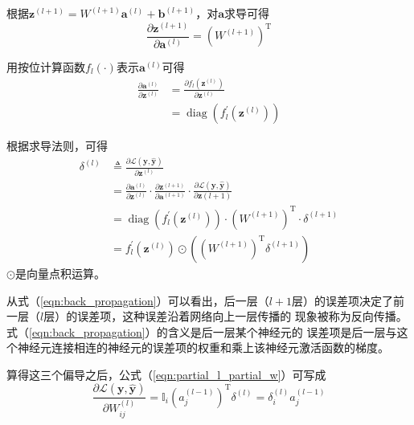 根据$\mathbf{z}^{(l+1)}=W^{(l+1)} \mathbf{a}^{(l)}+\mathbf{b}^{(l+1)}$，对$\mathbf{a}$求导可得
\begin{equation} 
\frac{\partial \mathbf{z}^{(l+1)}}{\partial \mathbf{a}^{(l)}}=\left(W^{(l+1)}\right)^{\mathrm{T}}
 \end{equation}

用按位计算函数$f_{l}(\cdot)$表示$\mathbf{a}^{(l)}$可得
\begin{equation} 
\begin{aligned} \frac{\partial \mathbf{a}^{(l)}}{\partial \mathbf{z}^{(l)}} &=\frac{\partial f_{l}\left(\mathbf{z}^{(l)}\right)}{\partial \mathbf{z}^{(l)}} \\ &=\operatorname{diag}\left(f_{l}^{\prime}\left(\mathbf{z}^{(l)}\right)\right) \end{aligned}
 \end{equation}

根据求导法则，可得
\begin{equation} 
\label{eqn:back_propagation}
\begin{aligned} \delta^{(l)} & \triangleq \frac{\partial \mathcal{L}(\mathbf{y}, \hat{\mathbf{y}})}{\partial \mathbf{z}^{(l)}} \\ 
&=\frac{\partial \mathbf{a}^{(l)}}{\partial \mathbf{z}^{(l)}} \cdot \frac{\partial \mathbf{z}^{(l+1)}}{\partial \mathbf{a}^{(l+1)}} \cdot \frac{\partial \mathcal{L}(\mathbf{y}, \hat{\mathbf{y}})}{\partial \mathbf{z}(l+1)} \\ 
&=\operatorname{diag}\left(f_{l}^{\prime}\left(\mathbf{z}^{(l)}\right)\right) \cdot\left(W^{(l+1)}\right)^{\mathrm{T}} \cdot \delta^{(l+1)} \\ &=f_{l}^{\prime}\left(\mathbf{z}^{(l)}\right) \odot\left(\left(W^{(l+1)}\right)^{\mathrm{T}} \delta^{(l+1)}\right) \end{aligned}
\end{equation}
$\odot$是向量点积运算。

从式（\ref{eqn:back_propagation}）可以看出，后一层（$l+1$层）的误差项决定了前一层（$l$层）的误差项，这种误差沿着网络向上一层传播的
现象被称为反向传播。式（\ref{eqn:back_propagation}）的含义是后一层某个神经元的
误差项是后一层与这个神经元连接相连的神经元的误差项的权重和乘上该神经元激活函数的梯度。

算得这三个偏导之后，公式（\ref{eqn:partial_l_partial_w}）可写成
\begin{equation} 
\frac{\partial \mathcal{L}(\mathbf{y}, \hat{\mathbf{y}})}{\partial W_{i j}^{(l)}}=\mathbb{I}_{i}\left(a_{j}^{(l-1)}\right)^{\mathrm{T}} \delta^{(l)}=\delta_{i}^{(l)} a_{j}^{(l-1)}
\end{equation}

